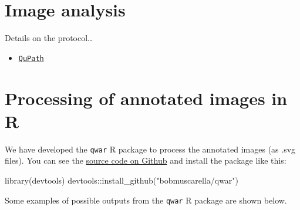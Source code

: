 \documentclass[
]{book}
\newenvironment{Shaded}{\begin{snugshade}}{\end{snugshade}}
\newcommand{\FunctionTok}[1]{\textcolor[rgb]{0.00,0.00,0.00}{#1}}
\newcommand{\NormalTok}[1]{#1}
\newcommand{\SpecialCharTok}[1]{\textcolor[rgb]{0.00,0.00,0.00}{#1}}
\newcommand{\StringTok}[1]{\textcolor[rgb]{0.31,0.60,0.02}{#1}}
\providecommand{\tightlist}{%
  \setlength{\itemsep}{0pt}\setlength{\parskip}{0pt}}
\begin{document}
\hypertarget{image-analysis}{%
\section*{Image analysis}\label{image-analysis}}

Details on the protocol\ldots{}

\begin{itemize}
\tightlist
\item
  \href{https://qupath.github.io/}{\texttt{QuPath}}
\end{itemize}

\hypertarget{processing-of-annotated-images-in-r}{%
\section*{Processing of annotated images in R}\label{processing-of-annotated-images-in-r}}

We have developed the \texttt{qwar} R package to process the annotated images (as .svg files). You can see the \href{https://github.com/bobmuscarella/qwar}{source code on Github} and install the package like this:

\begin{Shaded}
\begin{Highlighting}[]
\FunctionTok{library}\NormalTok{(devtools)}
\NormalTok{devtools}\SpecialCharTok{::}\FunctionTok{install\_github}\NormalTok{(}\StringTok{"bobmuscarella/qwar"}\NormalTok{)}
\end{Highlighting}
\end{Shaded}

Some examples of possible outputs from the \texttt{qwar} R package are shown below.
\end{document}
